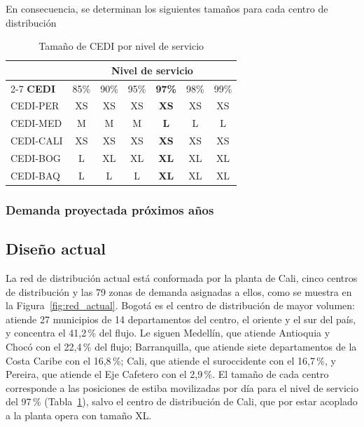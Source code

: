 \documentclass[fleqn, 11pt,letterpaper]{article}
\begin{document}
En consecuencia, se determinan los siguientes tamaños para cada centro de distribución
\begin{table}[H]
\centering
\caption{Tamaño de CEDI por nivel de servicio}
\label{tab:tamano_nivel_servicio}
\renewcommand{\arraystretch}{1.2}
\begin{tabular}{l *{6}{c}}
\toprule
 & \multicolumn{6}{c}{\textbf{Nivel de servicio}} \\
\cmidrule(lr){2-7}
\textbf{CEDI} & 85\% & 90\% & 95\% & \textbf{97\%} & 98\% & 99\% \\
\midrule
CEDI-PER  & XS & XS & XS & \textbf{XS} & XS & XS \\
CEDI-MED  & M  & M  & M  & \textbf{L}  & L  & L  \\
CEDI-CALI & XS & XS & XS & \textbf{XS} & XS & XS \\
CEDI-BOG  & L  & XL & XL & \textbf{XL} & XL & XL \\
CEDI-BAQ  & L  & L  & L  & \textbf{XL} & XL & XL \\
\bottomrule
\end{tabular}
\end{table}
\subsubsection{Demanda proyectada próximos años}

\subsection{Diseño actual}
La red de distribución actual está conformada por la planta de Cali, cinco centros de distribución y las 79 zonas de demanda asignadas a ellos, como se muestra en la Figura~\ref{fig:red_actual}. Bogotá es el centro de distribución de mayor volumen: atiende 27 municipios de 14 departamentos del centro, el oriente y el sur del país, y concentra el 41,2\,\% del flujo. Le siguen Medellín, que atiende Antioquia y Chocó con el 22,4\,\% del flujo; Barranquilla, que atiende siete departamentos de la Costa Caribe con el 16,8\,\%; Cali, que atiende el suroccidente con el 16,7\,\%, y Pereira, que atiende el Eje Cafetero con el 2,9\,\%. El tamaño de cada centro corresponde a las posiciones de estiba movilizadas por día para el nivel de servicio del 97\,\% (Tabla~\ref{tab:tamano_nivel_servicio}), salvo el centro de distribución de Cali, que por estar acoplado a la planta opera con tamaño XL.
\end{document}
